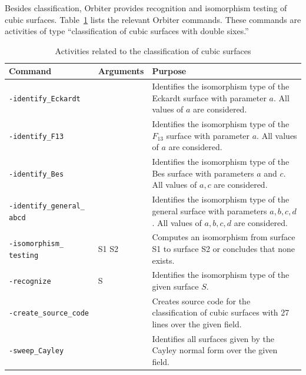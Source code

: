Besides classification, Orbiter provides recognition and isomorphism testing of cubic surfaces. 
Table~\ref{tab:surfaces:study} lists the relevant Orbiter commands.
These commands are activities of type ``classification of cubic surfaces with double sixes.''
\begin{table}
\begin{center}
\begin{tabular}{|p{4cm}|p{3cm}|p{8cm}|}
\hline
Command & Arguments & Purpose \\
\hline
\hline
\verb'-identify_Eckardt' & & 
Identifies the isomorphism type of the Eckardt surface with parameter $a$. All values of $a$ are considered. \\
\hline
\verb'-identify_F13' & & 
Identifies the isomorphism type of the $F_{13}$ surface with parameter $a$. All values of $a$ are considered. \\
\hline
\verb'-identify_Bes' & & 
Identifies the isomorphism type of the Bes surface with parameters $a$ and $c$. All values of $a,c$ are considered.\\
\hline
\verb'-identify_general_' \verb'abcd' & & 
Identifies the isomorphism type of the general surface with parameters $a,b,c,d$. All values of $a,b,c,d$ are considered.\\
\hline
\verb'-isomorphism_' \verb'testing' &  S1 S2 & 
Computes an isomorphism from surface S1 to surface S2 or concludes that none exists. \\
\hline
\verb'-recognize' &  S & 
Identifies the isomorphism type of the given surface $S$. \\
\hline
\verb'-create_source_code' &   & 
Creates source code for the classification of cubic surfaces 
with 27 lines over the given field. \\
\hline
\verb'-sweep_Cayley' &   & 
Identifies all surfaces given by the Cayley normal form over the given field. \\
\hline
\end{tabular}
\end{center}
\caption{\label{tab:surfaces:study}Activities related to the classification of cubic surfaces}
\end{table}





\bigskip



